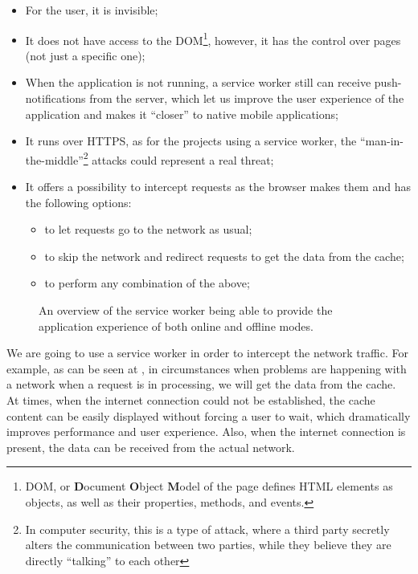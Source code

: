 \begin{itemize}
\item{For the user, it is invisible;}
\item{It does not have access to the DOM\footnote{DOM, or \textbf{D}ocument \textbf{O}bject \textbf{M}odel of the page defines HTML elements as objects, as well as their properties, methods, and events.}, however, it has the control over pages (not just a specific one);}
\item{When the application is not running, a service worker still can receive push-notifications from the server\cite{32}, which let us improve the user experience of the application and makes it ``closer'' to native mobile applications;}

\item{It runs over HTTPS, as for the projects using a service worker, the ``man-in-the-middle''\footnote{In computer security, this is a type of attack, where a third party secretly alters the communication between two parties, while they believe they are directly ``talking'' to each other\cite{33}} attacks could represent a real threat;}
\item{It offers a possibility to intercept requests as the browser makes them and has the following options:}
\begin{itemize}
\item{to let requests go to the network as usual;}
\item{to skip the network and redirect requests to get the data from the cache;}
\item{to perform any combination of the above;}
\end{itemize}
\end{itemize}

\begin{figure}[!htb]
    \begin{center}
    \def\svgwidth{0.7\linewidth}
    
    \caption {An overview of the service worker being able to provide the application experience of both online and offline modes.}
    \label{fig:sw_interact}
\end{center}
\end{figure}

We are going to use a service worker in order to intercept the network traffic. For example, as can be seen at , in circumstances when problems are happening with a network when a request is in processing, we will get the data from the cache. At times, when the internet connection could not be established, the cache content can be easily displayed without forcing a user to wait, which dramatically improves performance and user experience. Also, when the internet connection is present, the data can be received from the actual network. 

